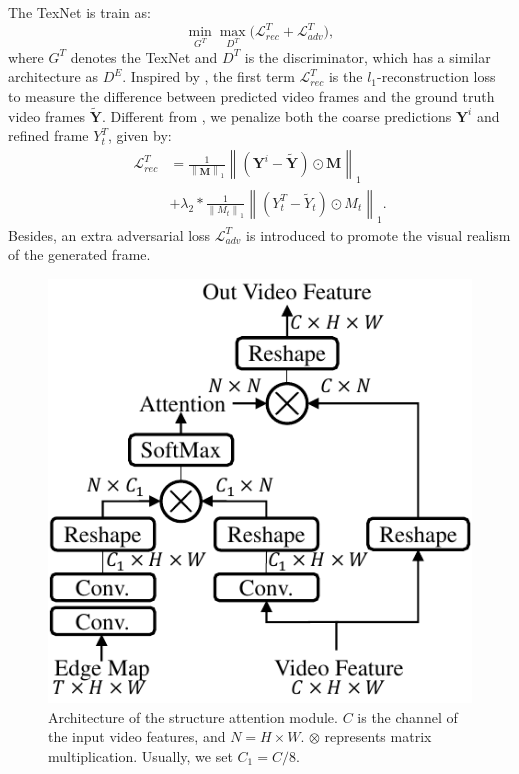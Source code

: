 The TexNet is train as:
%
\begin{equation}
	\label{eq:1}
	\min\limits_{G^T} \max \limits_{D^T} \big(\mathcal{L}^{T}_{rec}+\mathcal{L}^T_{adv}\big),
\end{equation}
where $G^T$ denotes the TexNet and $D^T$ is the discriminator, which has a similar architecture as $D^E$.
%
Inspired by \cite{nazeri2019edgeconnect}, the first term $\mathcal{L}^{T}_{rec}$ is the $l_1$-reconstruction loss to measure the difference between predicted video frames and the ground truth video frames $\widetilde{\boldsymbol{Y}}$.
Different from \cite{nazeri2019edgeconnect}, we penalize both the coarse predictions $\boldsymbol{Y}^i$ and refined frame $Y^{T}_t$, given by:
\begin{equation}
	\begin{aligned}
		\mathcal{L}^{T}_{rec}&=\frac{1}{\left\|\boldsymbol{M} \right\|_1}\left\|(\boldsymbol{Y}^i-\widetilde{\boldsymbol{Y}})\odot \boldsymbol{M}\right\|_1\\ &+\lambda_2*\frac{1}{\left\|M_t \right\|_1}\left\|(Y^T_t-\widetilde{Y}_t)\odot M_t\right\|_1.
	\end{aligned}
\end{equation}
%
%
Besides, an extra adversarial loss $\mathcal{L}^T_{adv}$ is introduced to promote the visual realism of the generated frame.





\begin{figure}[t]
	\centering
	\includegraphics[width=0.7\columnwidth]{SEM} %
	\caption{Architecture of the structure attention module. $C$ is the channel of the input video features, and $N=H\times W$. $\otimes$ represents matrix multiplication. Usually, we set $C_1=C/8$.}
	\label{SEM}
\end{figure} 



